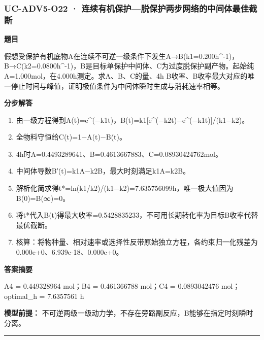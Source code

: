 \documentclass[UTF8,11pt,a4paper]{ctexart}
\begin{document}
\subsubsection*{UC-ADV5-O22 · 连续有机保护—脱保护两步网络的中间体最佳截断}
\noindent\textbf{题目}\par
假想受保护有机底物A在连续不可逆一级条件下发生A→B(k1=0.200h\textasciicircum{}-1)，B→C(k2=0.0800h\textasciicircum{}-1)，B是目标单保护中间体、C为过度脱保护副产物。起始纯A=1.000mol，在4.000h测定。求A、B、C的量、4h B收率、B收率最大对应的唯一停止时间与峰值，证明极值条件为中间体瞬时生成与消耗速率相等。\par
\medskip\noindent\textbf{分步解答}
\begin{enumerate}
\item 由一级方程得到A(t)=e\textasciicircum{}(−k1t)，B(t)=k1[e\textasciicircum{}(−k2t)−e\textasciicircum{}(−k1t)]/(k1−k2)。
\item 全物料守恒给C(t)=1−A(t)−B(t)。
\item 4h时A=0.4493289641、B=0.4613667883、C=0.08930424762mol。
\item 中间体导数B′(t)=k1A−k2B，最大时刻满足k1A=k2B。
\item 解析化简求得t*=ln(k1/k2)/(k1−k2)=7.635756099h，唯一极大值因为B(0)=B(∞)=0。
\item 将t*代入B(t)得最大收率=0.5428835233，不可用长期转化率为目标B收率代替最优截断。
\item 核算：将物种量、相对速率或选择性反带原始独立方程，各约束归一化残差为 0.000e+0、6.939e-18、0.000e+0。
\end{enumerate}
\noindent\textbf{答案摘要}\par
A4 = 0.449328964 mol；B4 = 0.461366788 mol；C4 = 0.0893042476 mol；optimal\_h = 7.6357561 h\par
\noindent\textbf{模型前提：}
不可逆两级一级动力学，不存在旁路副反应，B能够在指定时刻瞬时分离。\par
\medskip\hrule\medskip
{}
\end{document}
